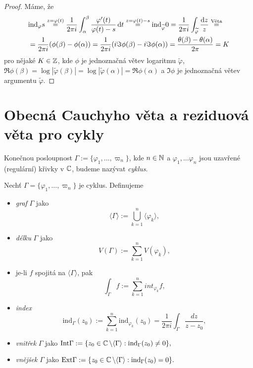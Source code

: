\begin{proof}
Máme, že
\begin{equation*}
\begin{aligned}
&\text{ind}_\varphi s\stackrel{z=\varphi(t)}{=}\frac{1}{2 \pi i}\int_\alpha^\beta \frac{\varphi'(t)}{\varphi(t)-s} \mathop{}\!\mathrm{d} t \stackrel{z=\varphi(t)-s}{=} \text{ind}_{\widetilde{\varphi}}0=\frac{1}{2 \pi i} \int_{\widetilde{\varphi}} \frac{\mathop{}\!\mathrm{d} z}{z}\stackrel{\text{Věta}}{=}\\ &=  \frac{1}{2 \pi i}(\phi(\beta)-\phi(\alpha))=\frac{1}{2 \pi i}(i \Im \phi(\beta)-i \Im \phi(\alpha))=\frac{\theta(\beta)-\theta(\alpha)}{2 \pi}=K
\end{aligned}
\end{equation*}
pro nějaké $K \in \operatorname{\mathbb{Z}}$, kde $\phi$ je jednoznačná větev logaritmu $\widetilde{\varphi}$, $\Re \phi (\beta)=\log |\widetilde{\varphi}(\beta)|=\log |\widetilde{\varphi}(\alpha)|=\Re \phi (\alpha)$ a $\Im \phi$ je jednoznačná větev argumentu $\widetilde{\varphi}$.
\end{proof}

\section{Obecná Cauchyho věta a reziduová věta pro cykly}

\begin{definition}
Konečnou posloupnost $\Gamma:=\{\varphi_1, ... ,\varpi_n\}$, kde $n\in\operatorname{\mathbb{N}}$ a $\varphi_1, ... \varphi_n$ jsou uzavřené (regulární) křivky v $\operatorname{\mathbb{C}} $, budeme nazývat \emph{cyklus}.
\end{definition}

\begin{notation}
Nechť $\Gamma = \{\varphi_1, ... ,\varpi_n\}$ je cyklus. Definujeme
\begin{itemize}
    \item \emph{graf} $\Gamma$ jako $$\langle\Gamma\rangle:=\bigcup_{k=1}^n \langle\varphi_k\rangle,$$
    \item \emph{délku} $\Gamma$ jako $$V\left(\Gamma\right):=\sum_{k=1}^n V(\varphi_k),$$ 
    \item je-li $f$ spojitá na $\langle\Gamma\rangle$, pak $$\int_\Gamma f := \sum_{k=1}^n int_{\varphi_k}f,$$
    \item \emph{index} $$\text{ind}_\Gamma(z_0):=\sum_{k=1}^n \text{ind}_{\varphi_k}(z_0) = \frac{1}{2\pi i}\int_\Gamma \frac{dz}{z-z_0},$$
    \item \emph{vnitřek} $\Gamma$ jako $\text{Int}\Gamma:=\{z_0\in\operatorname{\mathbb{C}} \setminus\langle\Gamma\rangle: \text{ind}_\Gamma(z_0)\neq 0\},$
    \item \emph{vnějšek} $\Gamma$ jako $\text{Ext} \Gamma:=\{z_0\in\operatorname{\mathbb{C}} \setminus\langle\Gamma\rangle: \text{ind}_\Gamma(z_0)=0\}.$
\end{itemize}
\end{notation}

